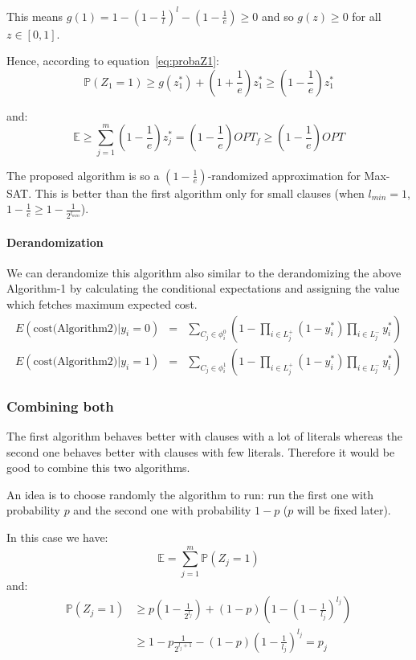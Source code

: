 This means $g(1) = 1- (1-\frac{1}{l})^l - (1-\frac{1}{e}) \ge 0$ and so $g(z) \ge 0$
for all $z \in [0,1]$.

Hence, according to equation~\eqref{eq:probaZ1}:
\[ \mathbb{P} (Z_1 = 1) \ge g(z^*_1) + \left( 1 + \frac{1}{e} \right) z^*_1 \ge
\left( 1 - \frac{1}{e} \right) z^*_1 \]

and:
\[ \mathbb{E} \ge \sum_{j=1}^m \left( 1 - \frac{1}{e} \right) z^*_j = \left( 1 -
\frac{1}{e} \right) OPT_f \ge \left( 1 - \frac{1}{e} \right) OPT \]

The proposed algorithm is so a $(1 - \frac{1}{e})$-randomized approximation for
Max-SAT. This is better than the first algorithm only for small clauses (when
$l_{min} = 1$, $1 - \frac{1}{e} \ge 1 - \frac{1}{2^{l_{min}}}$).

\paragraph{Derandomization}
We can derandomize this algorithm also similar to the derandomizing the above Algorithm-1 by calculating the conditional expectations and assigning the 
value which fetches maximum expected cost.
\begin{eqnarray}
E(\mbox{cost(Algorithm2)} | y_i = 0) & = &\sum_{C_j \in \phi_i^0} ( 1 - \prod_{i\in L_j^+}(1 - y_i^*) \prod_{i \in L_j^-} y_i^*) \nonumber \\
E(\mbox{cost(Algorithm2)} | y_i = 1) & = &\sum_{C_j \in \phi_i^1} ( 1 - \prod_{i\in L_j^+}(1 - y_i^*) \prod_{i \in L_j^-} y_i^*) \nonumber
\end{eqnarray}


\subsubsection{Combining both}

The first algorithm behaves better with clauses with a lot of literals whereas the
second one behaves better with clauses with few literals. Therefore it would be good
to combine this two algorithms.

An idea is to choose randomly the algorithm to run: run
the first one with probability $p$ and the second one with probability $1-p$ ($p$
will be fixed later).

In this case we have:
\[
\mathbb{E} = \sum_{j=1}^{m}{\mathbb{P}(Z_j = 1)}
\]
and:
\begin{align*}
\mathbb{P}(Z_j = 1) &\ge p \left( 1 - \frac{1}{2^{l_j}} \right) + (1-p) \left( 1 -
\left(1-\frac{1}{l_j}\right)^{l_j} \right) \\
&\ge 1 - p \frac{1}{2^{l_j+1}} - (1-p) \left(1-\frac{1}{l_j}\right)^{l_j} = p_j
\end{align*}


